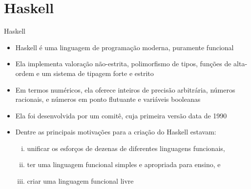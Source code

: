 \section{Haskell}

\begin{frame}[fragile]{Haskell}

    \begin{itemize}
        \item Haskell é uma linguagem de programação moderna, puramente funcional

        \item Ela implementa valoração não-estrita, polimorfismo de tipos, funções de alta-ordem
            e um sistema de tipagem forte e estrito

        \item Em termos numéricos, ela oferece inteiros de precisão arbitrária, números racionais,
            e números em ponto flutuante e variáveis booleanas

        \item Ela foi desenvolvida por um comitê, cuja primeira versão data de 1990

        \item Dentre as principais motivações para a criação do Haskell estavam:

        \begin{enumerate}[i.]
            \item unificar os esforços de dezenas de diferentes linguagens funcionais,
            \item ter uma linguagem funcional simples e apropriada para ensino, e
            \item criar uma linguagem funcional livre
        \end{enumerate}
    \end{itemize}

\end{frame}

